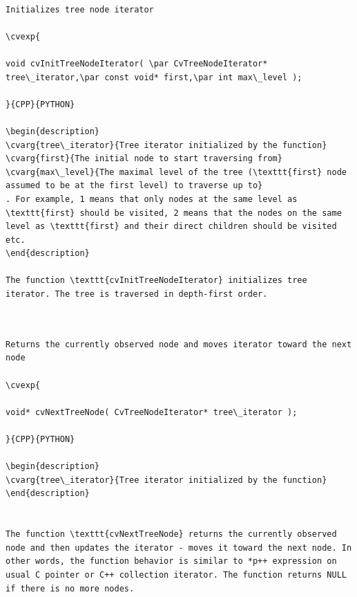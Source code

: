 \begin{verbatim}

Initializes tree node iterator

\cvexp{

void cvInitTreeNodeIterator( \par CvTreeNodeIterator* tree\_iterator,\par const void* first,\par int max\_level );

}{CPP}{PYTHON}

\begin{description}
\cvarg{tree\_iterator}{Tree iterator initialized by the function}
\cvarg{first}{The initial node to start traversing from}
\cvarg{max\_level}{The maximal level of the tree (\texttt{first} node assumed to be at the first level) to traverse up to}
. For example, 1 means that only nodes at the same level as \texttt{first} should be visited, 2 means that the nodes on the same level as \texttt{first} and their direct children should be visited etc.
\end{description}

The function \texttt{cvInitTreeNodeIterator} initializes tree iterator. The tree is traversed in depth-first order.


\end{verbatim}
\label{NextTreeNode}
\begin{verbatim}

Returns the currently observed node and moves iterator toward the next node

\cvexp{

void* cvNextTreeNode( CvTreeNodeIterator* tree\_iterator );

}{CPP}{PYTHON}

\begin{description}
\cvarg{tree\_iterator}{Tree iterator initialized by the function}
\end{description}


The function \texttt{cvNextTreeNode} returns the currently observed node and then updates the iterator - moves it toward the next node. In other words, the function behavior is similar to *p++ expression on usual C pointer or C++ collection iterator. The function returns NULL if there is no more nodes.


\end{verbatim}
\label{PrevTreeNode}
